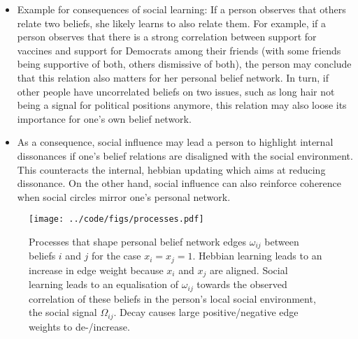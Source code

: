\documentclass[10pt]{article}
\begin{document}
\begin{itemize}
\begin{itemize}
    \end{itemize}
    \item Example for consequences of social learning: If a person observes that others relate two beliefs, she likely learns to also relate them. For example, if a person observes that there is a strong correlation between support for vaccines and support for Democrats among their friends (with some friends being supportive of both, others dismissive of both), the person may conclude that this relation also matters for her personal belief network. In turn, if other people have uncorrelated beliefs on two issues, such as long hair not being a signal for political positions anymore, this relation may also loose its importance for one's own belief network.   
    \item As a consequence, social influence may lead a person to highlight internal dissonances if one's belief relations are disaligned with the social environment. This counteracts the internal, hebbian updating which aims at reducing dissonance. On the other hand, social influence can also reinforce coherence when social circles mirror one's personal network.  
\end{itemize}

\begin{figure}
    \centering
    \texttt{[image: ../code/figs/processes.pdf]}
    \caption{Processes that shape personal belief network edges $\omega_{ij}$ between beliefs $i$ and $j$ for the case $x_i=x_j=1$. Hebbian learning leads to an increase in edge weight because $x_i$ and $x_j$ are aligned. Social learning leads to an equalisation of $\omega_{ij}$ towards the observed correlation of these beliefs in the person's local social environment, the social signal $\Omega_{ij}$. Decay causes large positive/negative edge weights to de-/increase.}
\end{figure}
\end{document}
